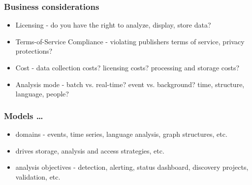\documentclass{beamer}
\begin{document}

\begin{frame}\frametitle{Business considerations}
{\Large
\begin{itemize}
\item Licensing - do you have the right to analyze, display, store data?
\item Terms-of-Service Compliance - violating publishers terms of service, privacy protections?
\item Cost - data collection costs? licensing costs? processing and storage costs?
\item Analysis mode - batch vs. real-time? event vs. background? time, structure, language, people?
\end{itemize}
}
\end{frame}



\begin{frame}\frametitle{Models \ldots}
{\Large
\begin{itemize}
\item domains - events, time series, language analysis, graph structures, etc.
\item drives storage, analysis and access strategies, etc.
\item analysis objectives - detection, alerting, status dashboard, discovery projects, validation, etc.
\end{itemize}
}
\end{frame}

\end{document}
